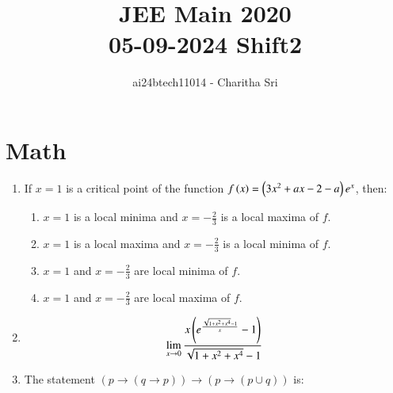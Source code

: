 \documentclass[journal,12pt,onecolumn]{IEEEtran}
\theoremstyle{remark}
\begin{document}

\vspace{3cm}

\title{JEE Main 2020 \\ 05-09-2024 Shift2}
\author{ai24btech11014 - Charitha Sri}

\maketitle
\bigskip       
\renewcommand{\thefigure}{\theenumi}
\renewcommand{\thetable}{\theenumi}



\section{Math}                                                      
\begin{enumerate}                     
\item If $x=1$ is a critical point of the function $f\left(x\right) = \left(3x^{2}+ax-2-a\right)e^{x}$, then:        
\begin{enumerate}                            
\item $x=1$ is a local minima and $x = -\frac{2}{3}$ is a local maxima of $f$.          
\item $x=1$ is a local maxima and $x=-\frac{2}{3}$ is a local minima of $f$.            
\item $x=1$ and $x=-\frac{2}{3}$ are local minima of $f$.           
\item $x=1$ and $x=-\frac{2}{3}$ are local maxima of $f$.       
\end{enumerate}
\item
	  \begin{align}
		  \lim_{x \to 0}\frac{x\left({e}^{\frac{\sqrt{1+x^{2}+x^{4}} - 1}{x}} -1 \right)}{\sqrt{1+x^{2}+x^{4}} - 1}
	  \end{align}
\begin{enumerate}
  \end{enumerate}
 \item The statement $(p \rightarrow (q \rightarrow p)) \rightarrow (p \rightarrow (p \cup q))$ is:
  \begin{enumerate}

\end{enumerate}
\end{enumerate}
\end{document}
